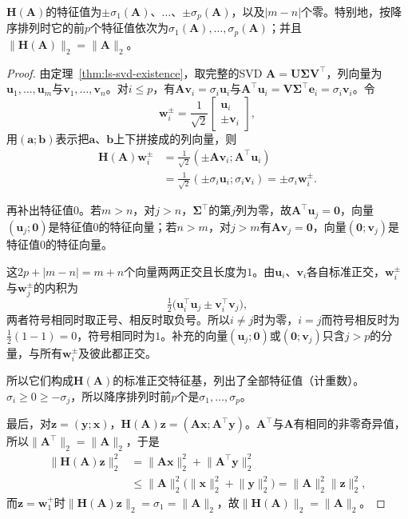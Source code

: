 \begin{lemma}[对称增广矩阵的谱]
\label{lem:ls-symmetric-augmentation-spectrum}
$\bm H(\bm A)$的特征值为$\pm\sigma_1(\bm A)$、$\ldots$、$\pm\sigma_p(\bm A)$，以及$|m-n|$个零。特别地，按降序排列时它的前$p$个特征值依次为$\sigma_1(\bm A),\ldots,\sigma_p(\bm A)$；并且$\lVert\bm H(\bm A)\rVert_2=\lVert\bm A\rVert_2$。
\end{lemma}
\begin{proof}
由定理~\ref{thm:ls-svd-existence}，取完整的SVD $\bm A=\bm U\bm\Sigma\bm V^\top$，列向量为$\bm u_1,\ldots,\bm u_m$与$\bm v_1,\ldots,\bm v_n$。对$i\leq p$，有$\bm A\bm v_i=\sigma_i\bm u_i$与$\bm A^\top\bm u_i=\bm V\bm\Sigma^\top\bm e_i=\sigma_i\bm v_i$。令
\[
 \bm w_i^{\pm}=\frac1{\sqrt2}\begin{bmatrix}\bm u_i\\\pm\bm v_i\end{bmatrix},
\]
用$(\bm a;\bm b)$表示把$\bm a$、$\bm b$上下拼接成的列向量，则
\[
 \begin{aligned}
 \bm H(\bm A)\bm w_i^{\pm}
 &=\tfrac1{\sqrt2}(\pm\bm A\bm v_i;\bm A^\top\bm u_i)\\
 &=\tfrac1{\sqrt2}(\pm\sigma_i\bm u_i;\sigma_i\bm v_i)=\pm\sigma_i\bm w_i^{\pm}.
 \end{aligned}
\]

再补出特征值$0$。若$m>n$，对$j>n$，$\bm\Sigma^\top$的第$j$列为零，故$\bm A^\top\bm u_j=\bm0$，向量$(\bm u_j;\bm0)$是特征值$0$的特征向量；若$n>m$，对$j>m$有$\bm A\bm v_j=\bm0$，向量$(\bm0;\bm v_j)$是特征值$0$的特征向量。

这$2p+|m-n|=m+n$个向量两两正交且长度为$1$。由$\bm u_i$、$\bm v_i$各自标准正交，$\bm w_i^{\pm}$与$\bm w_j^{\pm}$的内积为
\[
 \tfrac12\bigl(\bm u_i^\top\bm u_j\pm\bm v_i^\top\bm v_j\bigr),
\]
两者符号相同时取正号、相反时取负号。所以$i\neq j$时为零，$i=j$而符号相反时为$\tfrac12(1-1)=0$，符号相同时为$1$。补充的向量$(\bm u_j;\bm0)$或$(\bm0;\bm v_j)$只含$j>p$的分量，与所有$\bm w_i^{\pm}$及彼此都正交。

所以它们构成$\bm H(\bm A)$的标准正交特征基，列出了全部特征值（计重数）。$\sigma_i\geq0\geq-\sigma_j$，所以降序排列时前$p$个是$\sigma_1,\ldots,\sigma_p$。

最后，对$\bm z=(\bm y;\bm x)$，$\bm H(\bm A)\bm z=(\bm A\bm x;\bm A^\top\bm y)$。$\bm A^\top$与$\bm A$有相同的非零奇异值，所以$\lVert\bm A^\top\rVert_2=\lVert\bm A\rVert_2$，于是
\[
 \begin{aligned}
 \lVert\bm H(\bm A)\bm z\rVert_2^2
 &=\lVert\bm A\bm x\rVert_2^2+\lVert\bm A^\top\bm y\rVert_2^2\\
 &\leq\lVert\bm A\rVert_2^2\bigl(\lVert\bm x\rVert_2^2+\lVert\bm y\rVert_2^2\bigr)
 =\lVert\bm A\rVert_2^2\lVert\bm z\rVert_2^2 ,
 \end{aligned}
\]
而$\bm z=\bm w_1^+$时$\lVert\bm H(\bm A)\bm z\rVert_2=\sigma_1=\lVert\bm A\rVert_2$，故$\lVert\bm H(\bm A)\rVert_2=\lVert\bm A\rVert_2$。
\end{proof}

